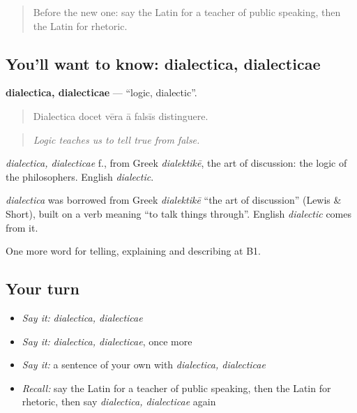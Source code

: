 \begin{quote}
Before the new one: say the Latin for a teacher of public speaking, then the Latin for rhetoric.
\end{quote}

\subsection*{You'll want to know: dialectica, dialecticae}
\textbf{dialectica, dialecticae} — \textquotedblleft{}logic, dialectic\textquotedblright{}.

\begin{quote}
Dialectica docet vēra ā falsīs distinguere.
\end{quote}

\begin{quote}
\emph{Logic teaches us to tell true from false.}
\end{quote}

\emph{dialectica, dialecticae} f., from Greek \emph{dialektikē}, the art of discussion: the logic of the philosophers. English \emph{dialectic}.

\begin{cousinweb}
\emph{dialectica} was borrowed from Greek \emph{dialektikē} \textquotedblleft{}the art of discussion\textquotedblright{} (Lewis \& Short), built on a verb meaning \textquotedblleft{}to talk things through\textquotedblright{}. English \emph{dialectic} comes from it.
\end{cousinweb}

\begin{grammarlens}[title={What you've built}]
One more word for telling, explaining and describing at B1.
\end{grammarlens}

\subsection*{Your turn}
\begin{itemize}
\raggedright
  \item \emph{Say it:} \emph{dialectica, dialecticae}
  \item \emph{Say it:} \emph{dialectica, dialecticae}, once more
  \item \emph{Say it:} a sentence of your own with \emph{dialectica, dialecticae}
  \item \emph{Recall:} say the Latin for a teacher of public speaking, then the Latin for rhetoric, then say \emph{dialectica, dialecticae} again
\end{itemize}

